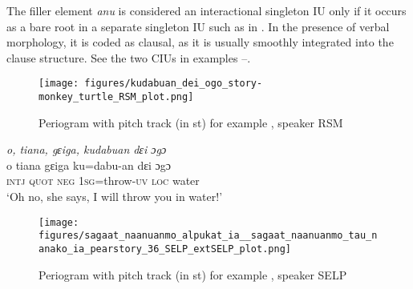 The filler element \textit{anu} is considered an interactional singleton IU only if it occurs as a bare root in a separate singleton IU such as in 	. In the presence of verbal morphology, it is coded as clausal, as it is usually smoothly integrated into the clause structure. See  the two CIUs in examples  --. 

\begin{figure}
	\texttt{[image: figures/kudabuan\_dei\_ogo\_story-monkey\_turtle\_RSM\_plot.png]}
	\caption{Periogram with pitch track (in st) for example , speaker RSM}
	\label{pitch:interactional anu}
\end{figure}



\ea
\label{ex:interactional anu}


\newpage
{
	\ex
	\label{ex:interactional_anu3}
	\textit{o, tiana, gɛiga, kudabuan dɛi ɔgɔ} \\
	\gll o tiana gɛiga ku=dabu-an dɛi ɔgɔ\\
	\textsc{intj} 	\textsc{quot} \textsc{neg} \textsc{1sg}=throw\textsc{-uv} \textsc{loc} water\\
	\glt `Oh no, she says, I will throw you in water!'
}
\z
\z




\begin{figure}
	\texttt{[image: figures/sagaat\_naanuanmo\_alpukat\_ia\_\_sagaat\_naanuanmo\_tau\_nanako\_ia\_pearstory\_36\_SELP\_extSELP\_plot.png]}
	\caption{Periogram with pitch track (in st) for example , speaker SELP}
	\label{pitch:a sagaat naanuanmo}
\end{figure}




